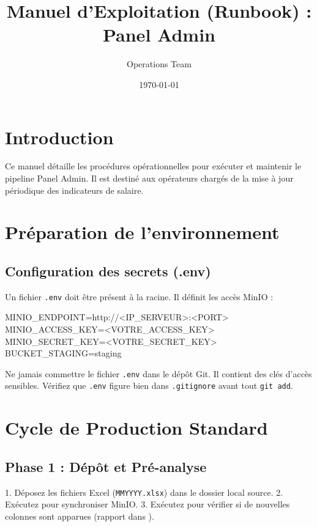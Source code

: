 \documentclass[12pt,a4paper,french]{article}
\title{Manuel d'Exploitation (Runbook) : Panel Admin}
\author{Operations Team}
\date{\today}
\begin{document}
\maketitle
\tableofcontents
\newpage

\section{Introduction}

Ce manuel détaille les procédures opérationnelles pour exécuter et maintenir le pipeline Panel Admin. Il est destiné aux opérateurs chargés de la mise à jour périodique des indicateurs de salaire.

\section{Préparation de l'environnement}

\subsection{Configuration des secrets (.env)}
Un fichier \texttt{.env} doit être présent à la racine. Il définit les accès MinIO :
\begin{codebox}[]
MINIO\_ENDPOINT=http://<IP\_SERVEUR>:<PORT>
MINIO\_ACCESS\_KEY=<VOTRE\_ACCESS\_KEY>
MINIO\_SECRET\_KEY=<VOTRE\_SECRET\_KEY>
BUCKET\_STAGING=staging
\end{codebox}
\begin{warningbox}[Sécurité]
Ne jamais commettre le fichier \texttt{.env} dans le dépôt Git. Il contient des clés d'accès sensibles. Vérifiez que \texttt{.env} figure bien dans \texttt{.gitignore} avant tout \texttt{git add}.
\end{warningbox}

\section{Cycle de Production Standard}

\subsection{Phase 1 : Dépôt et Pré-analyse}
1. Déposez les fichiers Excel (\texttt{MMYYYY.xlsx}) dans le dossier local source.
2. Exécutez  pour synchroniser MinIO.
3. Exécutez  pour vérifier si de nouvelles colonnes sont apparues (rapport dans ).
\end{document}
